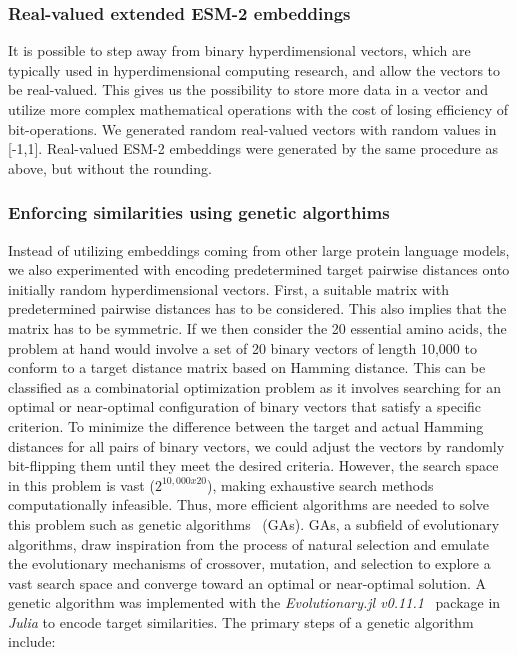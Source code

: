 \subsubsection*{Real-valued extended ESM-2 embeddings}
It is possible to step away from binary hyperdimensional vectors, which are typically used in hyperdimensional computing research, and allow the vectors to be real-valued. This gives us the possibility to store more data in a vector and utilize more complex mathematical operations with the cost of losing efficiency of bit-operations. We generated random real-valued vectors with random values in [-1,1]. Real-valued ESM-2 embeddings were generated by the same procedure as above, but without the rounding.
\subsubsection*{Enforcing similarities using genetic algorthims}
Instead of utilizing embeddings coming from other large protein language models, we also experimented with encoding predetermined target pairwise distances onto initially random hyperdimensional vectors. First, a suitable matrix with predetermined pairwise distances has to be considered. This also implies that the matrix has to be symmetric. If we then consider the 20 essential amino acids, the problem at hand would involve a set of 20 binary vectors of length 10,000 to conform to a target distance matrix based on Hamming distance. This can be classified as a combinatorial optimization problem as it involves searching for an optimal or near-optimal configuration of binary vectors that satisfy a specific criterion. To minimize the difference between the target and actual Hamming distances for all pairs of binary vectors, we could adjust the vectors by randomly bit-flipping them until they meet the desired criteria. However, the search space in this problem is vast ($2^{10,000 x 20}$), making exhaustive search methods computationally infeasible. Thus, more efficient algorithms are needed to solve this problem such as genetic algorithms~\cite{GA} (GAs). GAs, a subfield of evolutionary algorithms, draw inspiration from the process of natural selection and emulate the evolutionary mechanisms of crossover, mutation, and selection to explore a vast search space and converge toward an optimal or near-optimal solution. A genetic algorithm was implemented with the \textit{Evolutionary.jl v0.11.1}~\cite{evojl} package in \textit{Julia} to encode target similarities. The primary steps of a genetic algorithm include:

